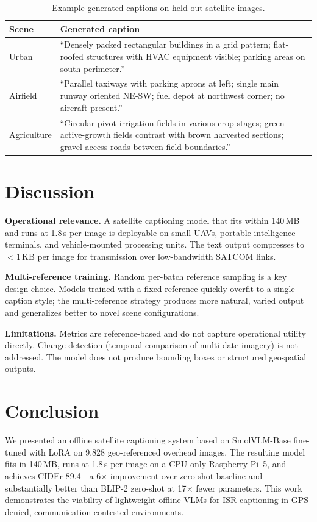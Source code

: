 \documentclass[conference]{IEEEtran}
\begin{document}
\begin{table}[h]
\centering
\caption{Example generated captions on held-out satellite images.}
\label{tab:qual}
\begin{tabular}{p{1.5cm}p{5.5cm}}
\toprule
Scene & Generated caption \\
\midrule
Urban &
``Densely packed rectangular buildings in a grid pattern; flat-roofed structures with HVAC
equipment visible; parking areas on south perimeter.'' \\
\midrule
Airfield &
``Parallel taxiways with parking aprons at left; single main runway oriented NE-SW; fuel
depot at northwest corner; no aircraft present.'' \\
\midrule
Agriculture &
``Circular pivot irrigation fields in various crop stages; green active-growth fields contrast
with brown harvested sections; gravel access roads between field boundaries.'' \\
\bottomrule
\end{tabular}
\end{table}

\section{Discussion}
\label{sec:discussion}

\textbf{Operational relevance.}
A satellite captioning model that fits within 140\,MB and runs at 1.8\,s per image is deployable
on small UAVs, portable intelligence terminals, and vehicle-mounted processing units. The text
output compresses to $<$1\,KB per image for transmission over low-bandwidth SATCOM links.

\textbf{Multi-reference training.}
Random per-batch reference sampling is a key design choice. Models trained with a fixed reference
quickly overfit to a single caption style; the multi-reference strategy produces more natural,
varied output and generalizes better to novel scene configurations.

\textbf{Limitations.}
Metrics are reference-based and do not capture operational utility directly. Change detection
(temporal comparison of multi-date imagery) is not addressed. The model does not produce bounding
boxes or structured geospatial outputs.

\section{Conclusion}
\label{sec:conclusion}

We presented an offline satellite captioning system based on SmolVLM-Base fine-tuned with LoRA
on 9,828 geo-referenced overhead images. The resulting model fits in 140\,MB, runs at 1.8\,s per
image on a CPU-only Raspberry Pi~5, and achieves CIDEr 89.4---a 6$\times$ improvement over
zero-shot baseline and substantially better than BLIP-2 zero-shot at 17$\times$ fewer parameters.
This work demonstrates the viability of lightweight offline VLMs for ISR captioning in GPS-denied,
communication-contested environments.
\end{document}
